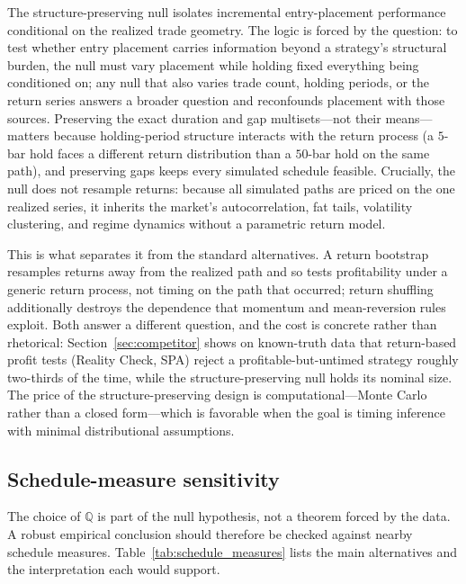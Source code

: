\documentclass[preprint,12pt]{elsarticle}
\theoremstyle{definition}
\begin{document}
The structure-preserving null isolates incremental entry-placement performance conditional on the realized trade geometry. The logic is forced by the question: to test whether entry placement carries information beyond a strategy's structural burden, the null must vary placement while holding fixed everything being conditioned on; any null that also varies trade count, holding periods, or the return series answers a broader question and reconfounds placement with those sources. Preserving the exact duration and gap multisets---not their means---matters because holding-period structure interacts with the return process (a $5$-bar hold faces a different return distribution than a $50$-bar hold on the same path), and preserving gaps keeps every simulated schedule feasible. Crucially, the null does not resample returns: because all simulated paths are priced on the one realized series, it inherits the market's autocorrelation, fat tails, volatility clustering, and regime dynamics without a parametric return model.

This is what separates it from the standard alternatives. A return bootstrap \cite{politisromano1994,Kunsch1989} resamples returns away from the realized path and so tests profitability under a generic return process, not timing on the path that occurred; return shuffling additionally destroys the dependence that momentum and mean-reversion rules exploit. Both answer a different question, and the cost is concrete rather than rhetorical: Section~\ref{sec:competitor} shows on known-truth data that return-based profit tests (Reality Check, SPA) reject a profitable-but-untimed strategy roughly two-thirds of the time, while the structure-preserving null holds its nominal size. The price of the structure-preserving design is computational---Monte Carlo rather than a closed form---which is favorable when the goal is timing inference with minimal distributional assumptions.

\subsection{Schedule-measure sensitivity}

The choice of $\mathbb{Q}$ is part of the null hypothesis, not a theorem forced by the data. A robust empirical conclusion should therefore be checked against nearby schedule measures. Table~\ref{tab:schedule_measures} lists the main alternatives and the interpretation each would support.
\end{document}
